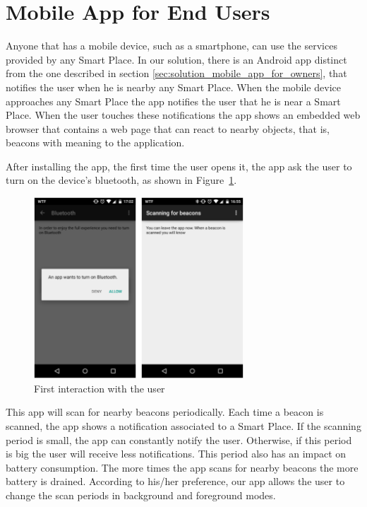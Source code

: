 \section{Mobile App for End Users}
\label{sec:solution_mobile_app_for_end_users}
Anyone that has a mobile device, such as a smartphone, can use the services provided by any Smart Place.
In our solution, there is an Android app distinct from the one described in section \ref{sec:solution_mobile_app_for_owners}, that notifies the user when he is nearby any Smart Place.
When the mobile device approaches any Smart Place the app notifies the user that he is near a Smart Place.
When the user touches these notifications the app shows an embedded web browser that contains a web page that can react to nearby objects, that is, beacons with meaning to the application.

After installing the app, the first time the user opens it, the app ask the user to turn on the device's bluetooth, as shown in Figure~\ref{fig:screenshot_clientapp_entry}.
\begin{figure}[!ht]
  \centering
    \includegraphics[width=0.7\textwidth, keepaspectratio]{images/screenshots/clientapp_entry}
    \caption[Users mobile app]{First interaction with the user}
    \label{fig:screenshot_clientapp_entry}
\end{figure}
This app will scan for nearby beacons periodically.
Each time a beacon is scanned, the app shows a notification associated to a Smart Place.
If the scanning period is small, the app can constantly notify the user. Otherwise, if this period is big the user will receive less notifications.
This period also has an impact on battery consumption.
The more times the app scans for nearby beacons the more battery is drained.
According to his/her preference, our app allows the user to change the scan periods in background and foreground modes.

